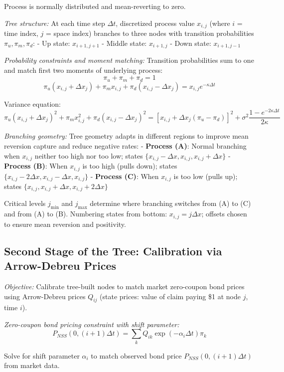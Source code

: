 \documentclass[12pt,a4paper]{article}
\begin{document}
Process is normally distributed and mean-reverting to zero.

\textit{Tree structure:} At each time step $\Delta t$, discretized process value $x_{i,j}$ (where $i$ = time index, $j$ = space index) branches to three nodes with transition probabilities $\pi_u, \pi_m, \pi_d$:
- Up state: $x_{i+1,j+1}$
- Middle state: $x_{i+1,j}$
- Down state: $x_{i+1,j-1}$

\textit{Probability constraints and moment matching:} Transition probabilities sum to one and match first two moments of underlying process:
$$\pi_u + \pi_m + \pi_d = 1$$
$$\pi_u(x_{i,j} + \Delta x_j) + \pi_m x_{i,j} + \pi_d(x_{i,j} - \Delta x_j) = x_{i,j}e^{-\kappa\Delta t}$$

Variance equation:
$$\pi_u(x_{i,j} + \Delta x_j)^2 + \pi_m x_{i,j}^2 + \pi_d(x_{i,j} - \Delta x_j)^2 = [x_{i,j} + \Delta x_j(\pi_u - \pi_d)]^2 + \sigma^2\frac{1-e^{-2\kappa\Delta t}}{2\kappa}$$

\textit{Branching geometry:} Tree geometry adapts in different regions to improve mean reversion capture and reduce negative rates:
- \textbf{Process (A)}: Normal branching when $x_{i,j}$ neither too high nor too low; states $\{x_{i,j} - \Delta x, x_{i,j}, x_{i,j} + \Delta x\}$
- \textbf{Process (B)}: When $x_{i,j}$ is too high (pulls down); states $\{x_{i,j} - 2\Delta x, x_{i,j} - \Delta x, x_{i,j}\}$
- \textbf{Process (C)}: When $x_{i,j}$ is too low (pulls up); states $\{x_{i,j}, x_{i,j} + \Delta x, x_{i,j} + 2\Delta x\}$

Critical levels $j_{\min}$ and $j_{\max}$ determine where branching switches from (A) to (C) and from (A) to (B). Numbering states from bottom: $x_{i,j} = j\Delta x$; offsets chosen to ensure mean reversion and positivity.

\subsection{Second Stage of the Tree: Calibration via Arrow-Debreu Prices}

\textit{Objective:} Calibrate tree-built nodes to match market zero-coupon bond prices using Arrow-Debreu prices $Q_{ij}$ (state prices: value of claim paying \$1 at node $j$, time $i$).

\textit{Zero-coupon bond pricing constraint with shift parameter:}
$$P_{NSS}(0, (i+1)\Delta t) = \sum_{k} Q_{ik}\exp(-\alpha_i\Delta t) \pi_k$$

Solve for shift parameter $\alpha_i$ to match observed bond price $P_{NSS}(0, (i+1)\Delta t)$ from market data.
\end{document}
